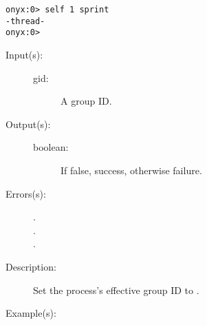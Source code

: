 \begin{description}
\begin{description}
\begin{verbatim}
onyx:0> self 1 sprint
-thread-
onyx:0>
		\end{verbatim}
	\end{description}
\label{systemdict:setegid}
\item[{\onyxop{gid}{setegid}{boolean}}: ]
	\begin{description}\item[]
	\item[Input(s): ]
		\begin{description}\item[]
		\item[gid: ]
			A group ID.
		\end{description}
	\item[Output(s): ]
		\begin{description}\item[]
		\item[boolean: ]
			If false, success, otherwise failure.
		\end{description}
	\item[Errors(s): ]
		\begin{description}\item[]
		\item[.]
		\item[.]
		\item[.]
		\end{description}
	\item[Description: ]
		Set the process's effective group ID to .
	\item[Example(s): ]\begin{verbatim}


\end{verbatim}
\end{description}
\end{description}
